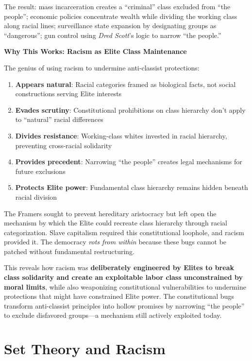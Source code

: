 \documentclass[12pt]{article}
\begin{document}
The result: mass incarceration creates a ``criminal'' class excluded from ``the people''; economic policies concentrate wealth while dividing the working class along racial lines; surveillance state expansion by designating groups as ``dangerous''; gun control using \textit{Dred Scott}'s logic to narrow ``the people.''

\textbf{Why This Works: Racism as Elite Class Maintenance}

The genius of using racism to undermine anti-classist protections:
\begin{enumerate}
    \item \textbf{Appears natural}: Racial categories framed as biological facts, not social constructions serving Elite interests
    \item \textbf{Evades scrutiny}: Constitutional prohibitions on class hierarchy don't apply to ``natural'' racial differences
    \item \textbf{Divides resistance}: Working-class whites invested in racial hierarchy, preventing cross-racial solidarity
    \item \textbf{Provides precedent}: Narrowing ``the people'' creates legal mechanisms for future exclusions
    \item \textbf{Protects Elite power}: Fundamental class hierarchy remains hidden beneath racial division
\end{enumerate}

The Framers sought to prevent hereditary aristocracy but left open the mechanism by which the Elite could recreate class hierarchy through racial categorization. Slave capitalism required this constitutional loophole, and racism provided it. The democracy \textit{rots from within} because these bugs cannot be patched without fundamental restructuring.

This reveals how racism was \textbf{deliberately engineered by Elites to break class solidarity and create an exploitable labor class unconstrained by moral limits}, while also weaponizing constitutional vulnerabilities to undermine protections that might have constrained Elite power. The constitutional bugs transform anti-classist principles into hollow promises by narrowing ``the people'' to exclude disfavored groups---a mechanism still actively exploited today.

\section{Set Theory and Racism}
\end{document}

